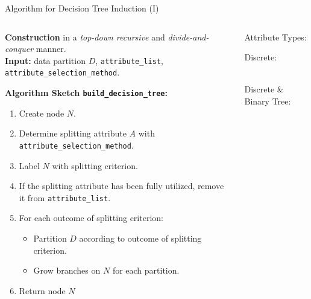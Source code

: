 \begin{frame}{Algorithm for Decision Tree Induction (I)}
	\vspace*{-0em}
	\begin{columns}
		\begin{column}{0.7\textwidth}
			\textbf{Construction} in a \textit{top-down recursive} and \textit{divide-and-conquer} manner.\\\medskip
			\textbf{Input:} data partition $D$, \texttt{attribute\_list}, \texttt{attribute\_selection\_method}.\\\medskip

			\textbf{Algorithm Sketch \texttt{build\_decision\_tree}:}
			\footnotesize
			\begin{enumerate}
				\item Create node $N$.
				\item Determine splitting attribute $A$ with \texttt{attribute\_selection\_method}.
				\item Label $N$ with splitting criterion.
				\item If the splitting attribute has been fully utilized, remove it from \texttt{attribute\_list}.
				\item For each outcome of splitting criterion:
				      \begin{itemize}
					      \footnotesize
					      \item Partition $D$ according to outcome of splitting criterion.
					      \item Grow branches on $N$ for each partition.
				      \end{itemize}
				\item Return node $N$
			\end{enumerate}


		\end{column}
		\begin{column}{0.2\textwidth}
			\vspace*{-2em}
			\centering

			Attribute Types:
			\small

			Discrete:
			\begin{figure}[t]
				\centering
				
			\end{figure}
			~ \\\bigskip
			Discrete \& Binary Tree:
			\begin{figure}[t]
				\centering
				
			\end{figure}


\end{column}
\end{columns}
\end{frame}
